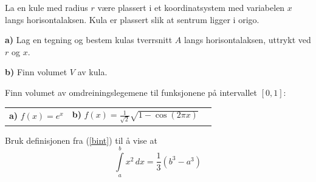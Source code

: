 \nes
{}
La en kule med radius $ r $ være plassert i et koordinatsystem med variabelen $ x $ langs horisontalaksen. Kula er plassert slik at sentrum ligger i origo.\os

\textbf{a)} Lag en tegning og bestem kulas tverrsnitt $ A $ langs horisontalaksen, uttrykt ved $ r $ og $ x $.\os

\textbf{b)} Finn volumet $ V $ av kula.

Finn volumet av omdreiningslegemene til funksjonene på intervallet $ [0, 1] $:\os

\begin{tabular}{@{}l l l}	
	\textbf{a)} $ f(x)=e^x  $&\quad\textbf{b)} $\displaystyle f(x)= \frac{1}{\sqrt{2}}\sqrt{1-\cos(2 \pi x)}$ &\quad
\end{tabular}
\newpage
{}
Bruk definisjonen fra (\ref{bint}) til å vise at
\[ \int\limits_a^b x^2 \,dx = \frac{1}{3}(b^3-a^3) \]

